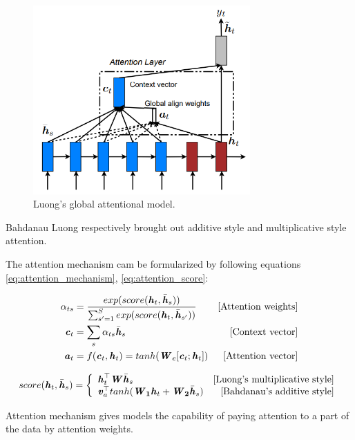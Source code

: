 \begin{figure}[!htbp]
    \centering
    \label{fig:luong-attention.png}
    \includegraphics[width=8.3cm]{fig/Survey/luong-attention.png}
    \caption{Luong's \cite{luong2015effective} global attentional model.}
\end{figure}

Bahdanau \cite{bahdanau2014neural} Luong \cite{luong2015effective} respectively brought out additive style and multiplicative style attention.

The attention mechanism cam be formularized by following equations \ref{eq:attention_mechanism}, \ref{eq:attention_score}:

\begin{align} \label{eq:attention_mechanism}
    \alpha_{ts}&=\frac{exp(score({\textbf{\textit{h}}}_{t},\bar {\textbf{\textit{h}}}_{s}))} { \sum_{s'=1}^S exp(score({\textbf{\textit{h}}}_{t},\bar {\textbf{\textit{h}}}_{s'} )) } &\text{[Attention\ weights]} \\
    \textbf{\textit{c}}_{t}&=\sum_s \alpha_{ts} \bar {\textbf{\textit{h}}}_{s} &\text{[Context\ vector]} \\
    \textbf{\textit{a}}_{t}&=f(\textbf{\textit{c}}_{t},\textbf{\textit{h}}_{t})=tanh({\textbf{\textit{W}}}_{\textbf{\textit{c}}} [\textbf{\textit{c}}_{t};\textbf{\textit{h}}_{t}]) &\text{[Attention\ vector]}
\end{align}

\begin{equation} \label{eq:attention_score}
    score({\textbf{\textit{h}}}_{t},\bar {\textbf{\textit{h}}}_{s}) = \left\{
    \begin{array}{lr}
    {\textbf{\textit{h}}}_{t}^\top\textbf{\textit{W}}\bar {\textbf{\textit{h}}}_{s} & {\text{[Luong's multiplicative style]}} \\
    \textbf{\textit{v}}_{a}^\top tanh({\textbf{\textit{W}}}_\textbf{1}{\textbf{\textit{h}}}_{t}+{\textbf{\textit{W}}}_\textbf{2}\bar {\textbf{\textit{h}}}_{s}) & {\text{[Bahdanau's additive style]}}
    \end{array}
    \right.
\end{equation}

Attention mechanism gives models the capability of paying attention to a part of the data by attention weights.
